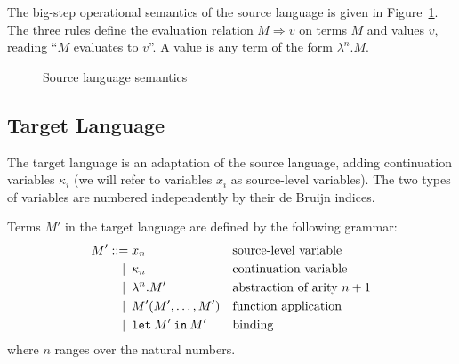 \documentclass[a4paper,11pt,draft]{article}
\newcommand{\kw}[1]{\mathtt{#1}}
\begin{document}
The big-step operational semantics of the source language is given in
Figure~\ref{fig:sourcesemantics}. The three rules define the evaluation relation
$M \Rightarrow v$ on terms $M$ and values $v$, reading ``$M$ evaluates to $v$''.
A value is any term of the form $\lambda^{n}.M$.

\begin{figure}
\caption{Source language semantics}
\label{fig:sourcesemantics}
\end{figure}

\subsection{Target Language}

The target language is an adaptation of the source language, adding
continuation variables $\kappa_{i}$ (we will refer to variables $x_{i}$
as source-level variables). The two types of variables are numbered
independently by their de Bruijn indices.

Terms $M'$ in the target language are defined by the following grammar:
\begin{align*}
M' ::=            &\; x_{n}
                  && \text{source-level variable} \\
\llap{\textbar\:} &\; \kappa_{n}
                  && \text{continuation variable} \\
\llap{\textbar\:} &\; \lambda^{n}.M'
                  && \text{abstraction of arity $n+1$} \\
\llap{\textbar\:} &\; M'(M', \ldots, M')
                  && \text{function application} \\
\llap{\textbar\:} &\; \kw{let} \: M' \: \kw{in} \: M'
                  && \text{binding}
\end{align*}
where $n$ ranges over the natural numbers.
\end{document}
